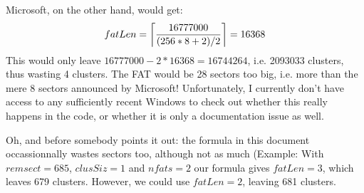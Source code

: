 \documentclass[a4paper,12pt]{article}
\begin{document}
Microsoft, on the other hand, would get: $$fatLen = \left\lceil{
16777000 \over (256 * 8 + 2)/2} \right\rceil = 16368$$ This would only
leave $16777000-2*16368=16744264$, i.e. 2093033 clusters, thus wasting
4 clusters. The FAT would be 28 sectors too big, i.e. more than the
mere 8 sectors announced by Microsoft! Unfortunately, I currently
don't have access to any sufficiently recent Windows to check out
whether this really happens in the code, or whether it is only a
documentation issue as well.

Oh, and before somebody points it out: the formula in this document
occassionnally wastes sectors too, although not as much (Example: With
$remsect=685$, $clusSiz=1$ and $nfats=2$ our formula gives $fatLen=3$,
which leaves 679 clusters. However, we could use $fatLen=2$, leaving
681 clusters.
\end{document}
